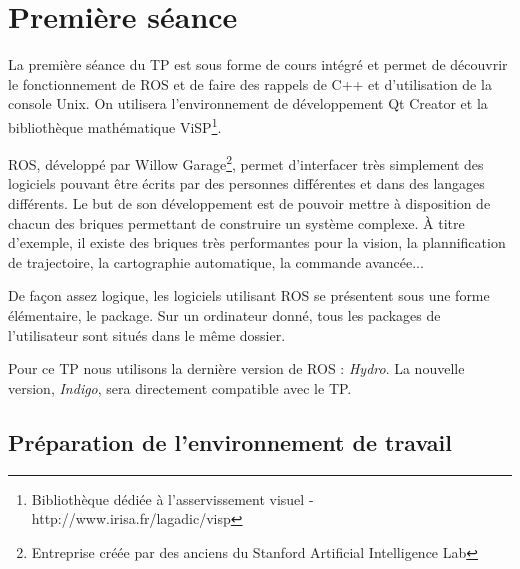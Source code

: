 \documentclass[12pt,a4paper]{article}
\begin{document}
\section{Première séance}

\hspace{12pt}La première séance du TP est sous forme de cours intégré et permet de découvrir le fonctionnement de ROS et de faire des rappels de C++ et d'utilisation de la console Unix. On utilisera l'environnement de développement Qt Creator et la bibliothèque mathématique ViSP\footnote{ Bibliothèque dédiée à l'asservissement visuel - http://www.irisa.fr/lagadic/visp}.

ROS, développé par Willow Garage\footnote{ Entreprise créée par des anciens du Stanford Artificial Intelligence Lab}, permet d'interfacer très simplement des logiciels pouvant être écrits par des personnes différentes et dans des langages différents.
Le but de son développement est de pouvoir mettre à disposition de chacun des briques permettant de construire un système complexe.
À titre d'exemple, il existe des briques très performantes pour la vision, la plannification de trajectoire, la cartographie automatique, la commande avancée...

De façon assez logique, les logiciels utilisant ROS se présentent sous une forme élémentaire, le package. Sur un ordinateur donné, tous les packages de l'utilisateur sont situés dans le même dossier.

Pour ce TP nous utilisons la dernière version de ROS : \emph{Hydro}. La nouvelle version, \emph{Indigo}, sera directement compatible avec le TP.

\subsection{Préparation de l'environnement de travail}

\def\bin{<binôme>}
\end{document}
